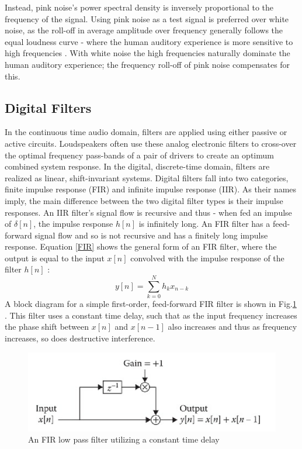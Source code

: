 \documentclass[conference]{IEEEtran}
\begin{document}
        Instead, pink noise's power spectral density is inversely proportional to the frequency of the signal.
        Using pink noise as a test signal is preferred over white noise, as the roll-off in average amplitude over frequency generally follows the equal loudness curve - where the human auditory experience is more sensitive to high frequencies \cite{GENELEC}.
        With white noise the high frequencies naturally dominate the human auditory experience; the frequency roll-off of pink noise compensates for this.
        
    \subsection{Digital Filters}
        In the continuous time audio domain, filters are applied using either passive or active circuits.
        Loudspeakers often use these analog electronic filters to cross-over the optimal frequency pass-bands of a pair of drivers to create an optimum combined system response.
        In the digital, discrete-time domain, filters are realized as linear, shift-invariant systems.
        Digital filters fall into two categories, finite impulse response (FIR) and infinite impulse response (IIR).
        As their names imply, the main difference between the two digital filter types is their impulse responses.
        An IIR filter's  signal flow is recursive and thus - when fed an impulse of $\delta[n]$, the impulse response $h[n]$ is infinitely long.
        An FIR filter has a feed-forward signal flow and so is not recursive and has a finitely long impulse response.
        Equation \ref{FIR} shows the general form of an FIR filter, where the output is equal to the input $x[n]$ convolved with the impulse response of the filter $h[n]$ \cite{JORDAN}:
        \begin{equation}\label{FIR}
            y[n] = \sum_{k=0}^N h_k x_{n-k}
        \end{equation}
        A block diagram for a simple first-order, feed-forward FIR filter is shown in Fig.\ref{BLOCK} \cite{EricTarr2018HAAI}.
        This filter uses a constant time delay, such that as the input frequency increases the phase shift between $x[n]$ and $x[n-1]$ also increases and thus as frequency increases, so does destructive interference.
        \begin{figure}[H]
            \centering
            \includegraphics[scale = 0.4]{resources/FIRLPF.png}
            \caption{An FIR low pass filter utilizing a constant time delay}
            \label{BLOCK}
        \end{figure}
\end{document}

